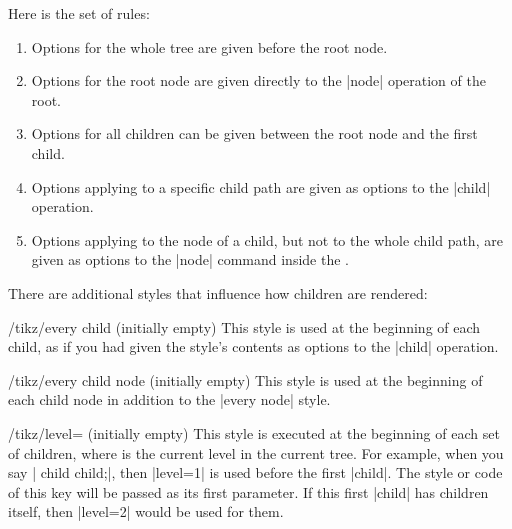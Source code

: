Here is the set of rules:
\begin{enumerate}
\item
  Options for the whole tree are given before the root node.
\item
  Options for the root node are given directly to the |node| operation
  of the root.
\item
  Options for all children can be given between the root node and the
  first child.
\item
  Options applying to a specific child path are given as options to
  the |child| operation.
\item
  Options applying to the node of a child, but not to the whole child
  path, are given as options to the |node| command inside the
  .
\end{enumerate}

\begin{codeexample}
\end{codeexample}

There are additional styles that influence how children are rendered:
\begin{stylekey}{/tikz/every child (initially \normalfont empty)}
  This style is used at the beginning of each child, as if you had
  given the style's contents as options to the |child| operation.
\end{stylekey}

\begin{stylekey}{/tikz/every child node (initially \normalfont empty)}
  This style is used at the beginning of each child node in addition
  to the |every node| style.
\end{stylekey}

\begin{stylekey}{/tikz/level= (initially \normalfont empty)}
  This style is executed at the beginning of each set of children, where
   is the current level in the current tree. For example,
  when you say | child child;|, then |level=1| is
  used before the first |child|. The style or code of this key will be
  passed  as its first parameter. If this first |child|
  has children itself, then |level=2| would be used for them.

\begin{codeexample}[]
\end{codeexample}
\end{stylekey}

